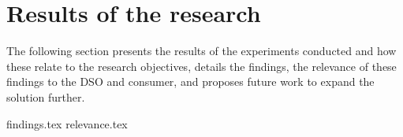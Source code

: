 \section{Results of the research}
\label{sec:results}

The following section presents the results of the experiments conducted and how these relate to the research objectives,
details the findings, the relevance of these findings to the DSO and consumer, and proposes future work to expand the solution further.

{findings.tex}
{relevance.tex}

